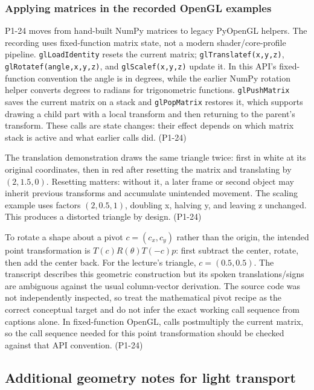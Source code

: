 \subsubsection{Applying matrices in the recorded OpenGL examples}\label{03-visual-computing-i-ch018-applying-matrices-in-the-recorded-opengl-examples}

P1-24 moves from hand-built NumPy matrices to legacy PyOpenGL helpers. The recording uses fixed-function matrix state, not a modern shader/core-profile pipeline. \texttt{glLoadIdentity} resets the current matrix; \texttt{glTranslatef(x,y,z)}, \texttt{glRotatef(angle,x,y,z)}, and \texttt{glScalef(x,y,z)} update it. In this API's fixed-function convention the angle is in degrees, while the earlier NumPy rotation helper converts degrees to radians for trigonometric functions. \texttt{glPushMatrix} saves the current matrix on a stack and \texttt{glPopMatrix} restores it, which supports drawing a child part with a local transform and then returning to the parent's transform. These calls are state changes: their effect depends on which matrix stack is active and what earlier calls did. (P1-24)

The translation demonstration draws the same triangle twice: first in white at its original coordinates, then in red after resetting the matrix and translating by \((2,1.5,0)\). Resetting matters: without it, a later frame or second object may inherit previous transforms and accumulate unintended movement. The scaling example uses factors \((2,0.5,1)\), doubling x, halving y, and leaving z unchanged. This produces a distorted triangle by design. (P1-24)

To rotate a shape about a pivot \(c=(c_x,c_y)\) rather than the origin, the intended point transformation is \(T(c)R(\theta)T(-c)p\): first subtract the center, rotate, then add the center back. For the lecture's triangle, \(c=(0.5,0.5)\). The transcript describes this geometric construction but its spoken translations/signs are ambiguous against the usual column-vector derivation. The source code was not independently inspected, so treat the mathematical pivot recipe as the correct conceptual target and do not infer the exact working call sequence from captions alone. In fixed-function OpenGL, calls postmultiply the current matrix, so the call sequence needed for this point transformation should be checked against that API convention. (P1-24)

\subsection{Additional geometry notes for light transport}\label{03-visual-computing-i-ch018-additional-geometry-notes-for-light-transport}

